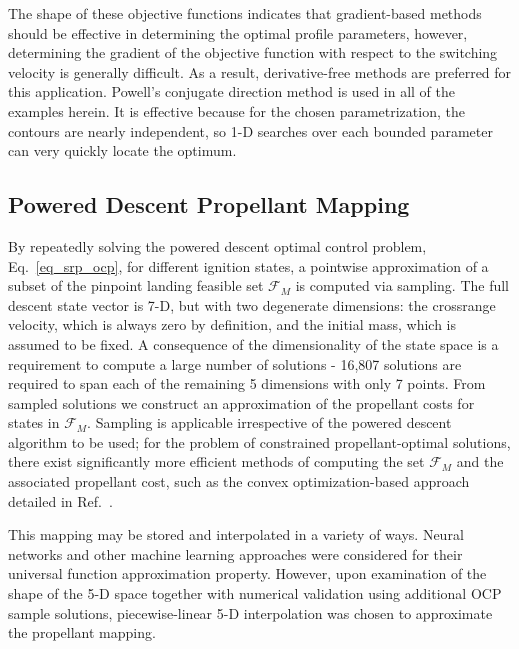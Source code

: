 The shape of these objective functions indicates that gradient-based methods should be effective in determining the optimal profile parameters, however, determining the gradient of the objective function with respect to the switching velocity is generally difficult. As a result, derivative-free methods are preferred for this application. Powell's conjugate direction method \cite{PowellsMethod} is used in all of the examples herein. It is effective because for the chosen parametrization, the contours are nearly independent, so 1-D searches over each bounded parameter can very quickly locate the optimum. 

\subsection{Powered Descent Propellant Mapping}
By repeatedly solving the powered descent optimal control problem, Eq.~\ref{eq_srp_ocp}, for different ignition states, a pointwise approximation of a subset of the pinpoint landing feasible set $\mathcal{F}_M$ is computed via sampling. The full descent state vector is 7-D, but with two degenerate dimensions: the crossrange velocity, which is always zero by definition, and the initial mass, which is assumed to be fixed. A consequence of the dimensionality of the state space is a requirement to compute a large number of solutions -  16,807 solutions are required to span each of the remaining 5 dimensions with only 7 points. From sampled solutions we construct an approximation of the propellant costs for states in $\mathcal{F}_M$. Sampling is applicable irrespective of the powered descent algorithm to be used; for the problem of constrained propellant-optimal solutions, there exist significantly more efficient methods of computing the set $\mathcal{F}_M$ and the associated propellant cost, such as the convex optimization-based approach detailed in Ref.~\cite{SRP_ControllableSets}.

This mapping may be stored and interpolated in a variety of ways. Neural networks and other machine learning approaches were considered for their universal function approximation property. However, upon examination of the shape of the 5-D space together with numerical validation using additional OCP sample solutions, piecewise-linear 5-D interpolation was chosen to approximate the propellant mapping.

